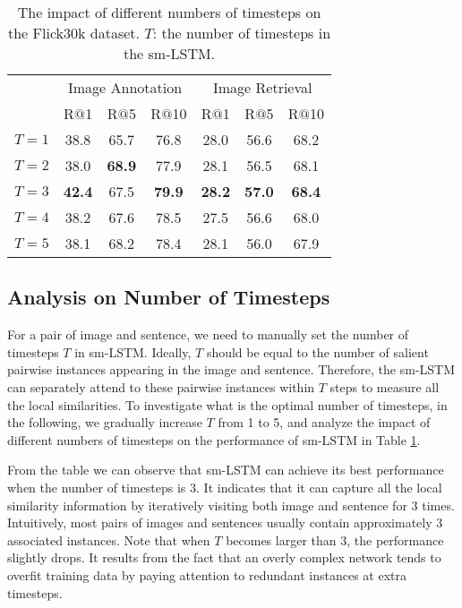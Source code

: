 \documentclass[10pt,twocolumn,letterpaper]{article}
\begin{document}
\begin{table}[t] \small
\centering
\caption{The impact of different numbers of timesteps on the Flick30k dataset. $T$: the number of timesteps in the sm-LSTM.}
\begin{tabular}{l|ccc|ccc}
\hline
\hline
\multirow{2}{0.7cm}{}     &  \multicolumn{3}{c|}{Image Annotation}  &  \multicolumn{3}{c}{Image Retrieval}   \\
\cline{2-7}
     & R$@$1 & R$@$5  & R$@$10   & R$@$1 & R$@$5  & R$@$10     \\
\hline
\hspace{0mm} $T=1$      &38.8 &65.7 &76.8 &28.0 &56.6 &68.2 \\
\hspace{0mm} $T=2$      &38.0 &\bf{68.9} &77.9 &28.1 &56.5 &68.1 \\
\hspace{0mm} $T=3$      &\bf{42.4} &67.5 &\bf{79.9} &\bf{28.2} &\bf{57.0} &\bf{68.4} \\
\hspace{0mm} $T=4$      &38.2 &67.6 &78.5 &27.5 &56.6 &68.0  \\
\hspace{0mm} $T=5$      &38.1 &68.2 &78.4 &28.1 &56.0 &67.9  \\

\hline
\hline
\end{tabular}
\label{table:step}
\end{table}











\subsection{Analysis on Number of Timesteps} \label{sec:temporal-step}
For a pair of image and sentence, we need to manually set the number of timesteps $T$ in sm-LSTM.
Ideally, $T$ should be equal to the number of salient pairwise instances appearing in the image and sentence.
Therefore, the sm-LSTM can separately attend to these pairwise instances
within $T$ steps to measure all the local similarities.
To investigate what is the optimal number of timesteps,
in the following, we gradually increase $T$ from 1 to 5, and
analyze the impact of different numbers of timesteps on the performance of sm-LSTM
in Table \ref{table:step}.

From the table we can observe that sm-LSTM
can achieve its best performance when the
number of timesteps is 3. It indicates that it can
capture all the local similarity information by iteratively visiting both image and sentence for 3 times.
Intuitively, most pairs of images and sentences usually contain approximately 3 associated instances.
Note that when $T$ becomes larger than 3, the performance slightly drops.
It results from the fact that an overly complex network tends to overfit training data
by paying attention to redundant instances at extra timesteps.
\end{document}
